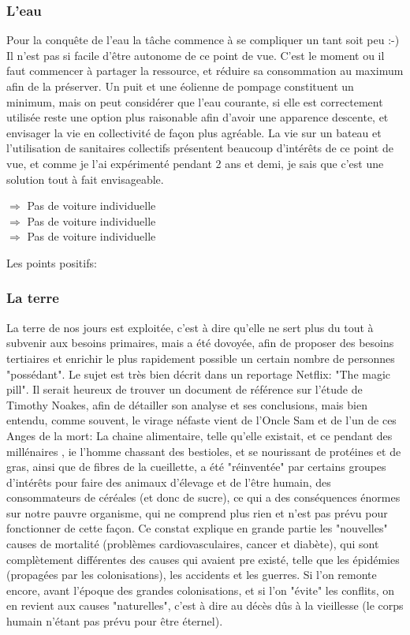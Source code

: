 \documentclass[11pt]{article} %
\begin{document}
\subsubsection{L'eau}
Pour la conquête de l'eau la tâche commence à se compliquer un tant soit peu :-)
Il n'est pas si facile d'être autonome de ce point de vue. C'est le moment ou il faut commencer à partager la ressource, et réduire sa consommation au maximum afin de la préserver. Un puit et une éolienne de pompage constituent un minimum, mais on peut considérer que l'eau courante, si elle est correctement utilisée reste une option plus raisonable afin d'avoir une apparence descente, et envisager la vie en collectivité de façon plus agréable.
La vie sur un bateau et l'utilisation de sanitaires collectifs présentent beaucoup d'intérêts de ce point de vue, et comme je l'ai expérimenté pendant 2 ans et demi, je sais que c'est une solution tout à fait envisageable.\\
\begin{flushleft}
$ \Rightarrow $ Pas de voiture individuelle\\
$ \Rightarrow $ Pas de voiture individuelle\\
$ \Rightarrow $ Pas de voiture individuelle\\
\end{flushleft}

Les points positifs:


\subsubsection{La terre}
La terre de nos jours est exploitée, c'est à dire qu'elle ne sert plus du tout à subvenir aux besoins primaires, mais a été dovoyée, afin de proposer des besoins tertiaires et enrichir le plus rapidement possible un certain nombre de personnes "possédant".
Le sujet est très bien décrit dans un reportage Netflix: "The magic pill". Il serait heureux de trouver un document de référence sur l'étude de Timothy Noakes, afin de détailler son analyse et ses conclusions, mais bien entendu, comme souvent, le virage néfaste vient de l'Oncle Sam et de l'un de ces Anges de la mort:
La chaine alimentaire, telle qu'elle existait, et ce pendant des millénaires , ie l'homme chassant des bestioles, et se nourissant de protéines et de gras, ainsi que de fibres de la cueillette, a été "réinventée" par certains groupes d'intérêts pour faire des animaux d'élevage et de l'être humain, des consommateurs de céréales (et donc de sucre), ce qui a des conséquences énormes sur notre pauvre organisme, qui ne comprend plus rien et n'est pas prévu pour fonctionner de cette façon.
Ce constat explique en grande partie les "nouvelles" causes de mortalité (problèmes cardiovasculaires, cancer et diabète), qui sont complètement différentes des causes qui avaient pre existé, telle que les épidémies (propagées par les colonisations), les accidents et les guerres. 
Si l'on remonte encore, avant l'époque des grandes colonisations, et si l'on "évite" les conflits, on en revient aux causes "naturelles", c'est à dire au décès dûs à la vieillesse (le corps humain n'étant pas prévu pour être éternel).\\
\end{document}

